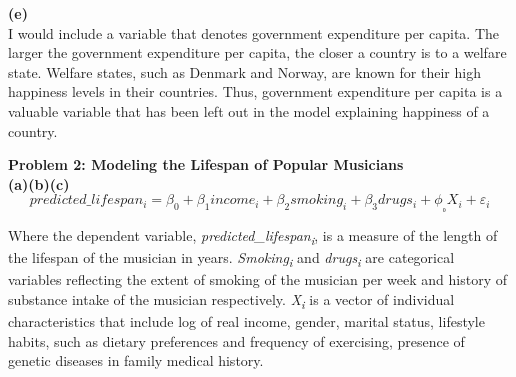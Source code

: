 \documentclass[letterpaper,12pt]{article}
\theoremstyle{definition}
\begin{document}
\flushleft \textbf{(e)}\\
I would include a variable that denotes government expenditure per capita. The larger the government expenditure per capita, the closer a country is to a welfare state. Welfare states, such as Denmark and Norway, are known for their high happiness levels in their countries. Thus, government expenditure per capita is a valuable variable that has been left out in the model explaining happiness of a country.

\noindent \flushleft \textbf{Problem 2: Modeling the Lifespan of Popular Musicians}\\
\textbf{(a)(b)(c)}
\begin{equation}
predicted\_lifespan_{i}=\beta_0+	\beta_1income_{i}+\beta_2smoking_i+\beta_3drugs_{i}+\phi_₀X_i+\varepsilon_{i}
\end{equation}

\flushleft Where the dependent variable, \textit{predicted\_lifespan\textsubscript{i}}, is a measure of the length of the lifespan of the musician in years.  \textit{Smoking\textsubscript{i}} and \textit{drugs\textsubscript{i}} are categorical variables reflecting the extent of smoking of the musician per week and history of substance intake of the musician respectively. \textit{X\textsubscript{i}} is a vector of individual characteristics that include log of real income, gender, marital status, lifestyle habits, such as dietary preferences and frequency of exercising, presence of genetic diseases in family medical history.\\
 
\end{document}
